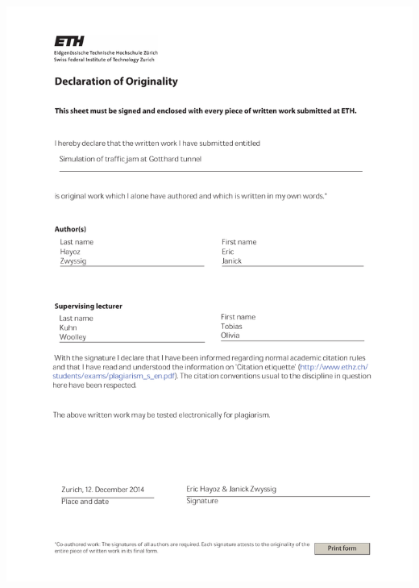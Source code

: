 \documentclass[11pt]{article}
\begin{document}
\begin{center}

\bigskip


\bigskip


\end{center}
\newpage
\includegraphics[width=\textwidth]{originality.pdf}
\newline
\begin{minipage}{0.33\textwidth}
\end{minipage}
\begin{minipage}{0.33\textwidth}
\end{minipage}

\clearpage

\tableofcontents

\newpage
\end{document}

